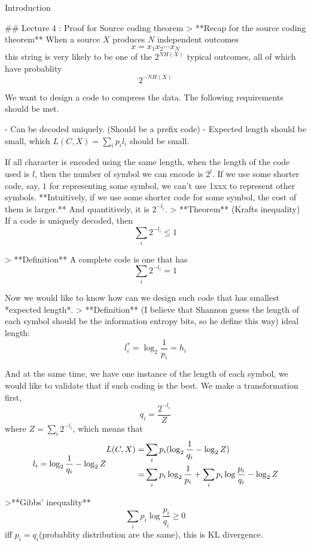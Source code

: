 \documentclass{beamer}
\begin{document}
\begin{frame}[allowframebreaks]{Introduction}
    
    ## Lecture 4 : Proof for Source coding theorem
    > **Recap for the source coding theorem**
    When a source $X$ produces $N$ independent outcomes 
    $$x=x_1x_2\cdots x_N$$
    this string is very likely to be one of the $2^{NH(X)}$ typical outcomes, all of which have probablity $$2^{-NH(X)}$$
    
    We want to design a code to compress the data. The following requirements should be met.
    
    - Can be decoded uniquely. (Should be a prefix code)
    - Expected length should be small, which $L(C,X) = \sum_i p_i l_i$ should be small.
    
    If all character is encoded using the same length, when the length of the code used is $l$, then the number of symbol we can encode is $2^l$. If we use some shorter code, say, $1$ for representing some symbol, we can't use 1xxx to represent other symbols. **Intuitively, if we use some shorter code for some symbol, the cost of them is larger.** And quantitively, it is $2^{-l_i}$. 
    > **Theorem** (Krafts inequality)
    If a code is uniquely decoded, then 
    $$\sum_i 2^{-l_i} \le 1$$
    
    > **Definition** 
    A complete code is one that has 
    $$\sum_i 2^{-l_i} = 1$$
    
    
    
    Now we would like to know how can we design such code that has smallest *expected length*. 
    > **Definition** 
    (I believe that Shannon guess the length of each symbol should be the information entropy bits, so he define this way)
    ideal length: $$l_i^*=\log_2\frac{1}{p_i}=h_i$$
    
    And at the same time, we have one instance of the length of each symbol, we would like to validate that if such coding is the best. We make a transformation first, $$q_i = \frac{2^{-l_i}}{Z}$$ 
    where $Z = \sum_i 2^{-l_i}$, which means that 
    $$l_i=\log_2 \frac{1}{q_i}-\log_2Z\\
    \begin{align}
    L(C,X)=&\sum_ip_i(\log_2 \frac{1}{q_i}-\log_2Z)\\
    =&\sum_ip_i\log_2 \frac{1}{p_i} + \sum_ip_i\log\frac{p_i}{q_i}-\log_2Z
    \end{align}$$
      
    >**Gibbs' inequality**
    $$\sum_i p_i \log \frac{p_i}{q_i} \ge 0$$ iff $p_i = q_i$(probablity distribution are the same), this is KL divergence.
    

\end{frame}
\end{document}
